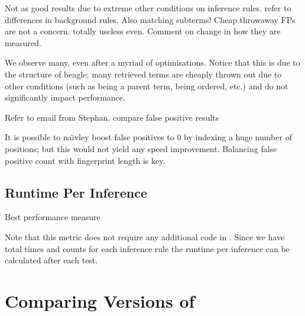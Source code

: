 Not as good results due to extreme other conditions on inference rules.
refer to differences in background rules. Also matching subterms!
Cheap throwaway FPs are not a concern.
totally useless even. Comment on change in how they are measured.

We observe many, even after a myriad of optimisations. Notice
that this is due to the structure of beagle; many retrieved terms
are cheaply thrown out due to other conditions (such as being a parent
term, being ordered, etc.) and do not significantly impact performance.

Refer to email from Stephan. compare false positive results

It is possible to na\"{\i}vley boost false positives to 0 by indexing a
huge number of positions; but this would not yield any speed improvement. Balancing false positive count with fingerprint
length is key.

\subsection{Runtime Per Inference}

Best performance measure

Note that this metric does not require any additional code in \beagle. Since we
have total times and counts for each inference rule the runtime per inference can
be calculated after each test.

\section{Comparing Versions of \Beagle}
\label{sec:indexresults}

